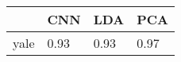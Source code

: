 \begin{tabular}{|r|l|l|l|}
  \hline
    & CNN & LDA & PCA \\
  \hline
  yale & 0.93 & 0.93 & 0.97 \\
  \hline
\end{tabular}
